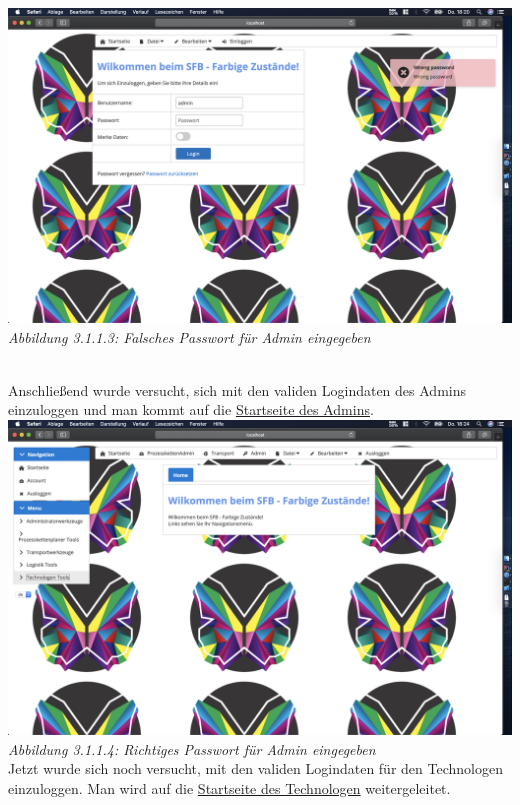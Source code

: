 \documentclass[enabledeprecatedfontcommands,fontsize=12pt,paper=a4,twoside]{scrartcl}
\begin{document}
\hypertarget{sc3.1.1.3}{
\includegraphics[width=1\textwidth]{Screenshots/311wrongPassword.png}
\textit{Abbildung 3.1.1.3: Falsches Passwort für Admin eingegeben}
} \\

Anschließend wurde versucht, sich mit den validen Logindaten des Admins einzuloggen und man kommt auf die \hyperlink{sc3.1.1.4}{Startseite des Admins}. \\

\hypertarget{sc3.1.1.4}{
\includegraphics[width=1\textwidth]{Screenshots/311AdminView.png}
\textit{Abbildung 3.1.1.4: Richtiges Passwort für Admin eingegeben}
} \\

Jetzt wurde sich noch versucht, mit den validen Logindaten für den Technologen einzuloggen. Man wird auf die \hyperlink{sc3.1.1.5}{Startseite des Technologen} weitergeleitet. \\
\end{document}
